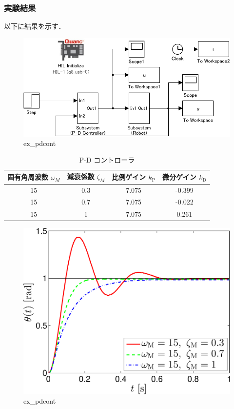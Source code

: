 \subsubsection{実験結果}
以下に結果を示す．

\begin{figure}[h]
  \centering
  \includegraphics[scale=1]{sozai/ex_pdcont-crop.pdf}
  \caption{ex\_pdcont}
\end{figure}

\begin{table}[h]
  \centering
  \caption{P-D コントローラ}
  \begin{tabular}{|c|c|c|c|}
    \hline
    固有角周波数 $\omega_M$ & 減衰係数 $\zeta_M$ & 比例ゲイン $k_{\mathrm{P}}$ & 微分ゲイン $k_{\mathrm{D}}$ \\
    \hline
    15                      & 0.3                & 7.075                       & -0.399                      \\
    15                      & 0.7                & 7.075                       & -0.022                      \\
    15                      & 1                  & 7.075                       & 0.261                       \\
    \hline
  \end{tabular}
\end{table}

\begin{figure}[h]
  \centering
  \includegraphics[scale=0.5]{sozai/figure_pdcont_angle-crop.pdf}
  \caption{ex\_pdcont}
\end{figure}


